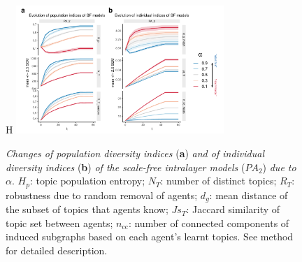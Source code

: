 \begin{figure}{H}
    \centering
    \includegraphics[width=0.7\textwidth,center]{../figures/report/Fig3.pdf}
    \caption{\label{fig:3}
    \textit{Changes of population diversity indices} (\textbf{a}) \textit{and of individual diversity indices} (\textbf{b}) \textit{of the scale-free intralayer models} ($PA_2$) \textit{due to} $\alpha$. $H_p$: topic population entropy; $N_T$: number of distinct topics; $R_T$: robustness due to random removal of agents; $d_g$: mean distance of the subset of topics that agents know; $Js_T$: Jaccard similarity of topic set between agents; $n_{\mathrm{cc}}$: number of connected components of induced subgraphs based on each agent's learnt topics. See method for detailed description.
    }
\end{figure}
